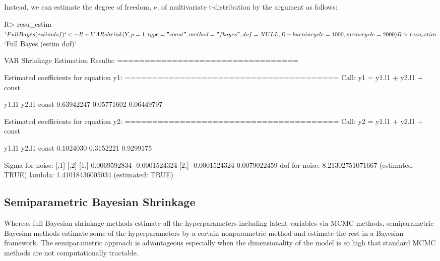 \documentclass[
]{jss}
\begin{document}
Instead, we can estimate the degree of freedom, \(\nu\), of multivariate
t-distribution by the argument  as follows:

\begin{CodeChunk}

\begin{CodeInput}
R> resu_estim$`Full Bayes (estim dof)` <-
R+   VARshrink(Y, p = 1, type = "const", method = "fbayes", dof = NULL,
R+             burnincycle = 1000, mcmccycle = 2000)
R> resu_estim$`Full Bayes (estim dof)`
\end{CodeInput}

\begin{CodeOutput}

VAR Shrinkage Estimation Results:
================================= 

Estimated coefficients for equation y1: 
======================================= 
Call:
y1 = y1.l1 + y2.l1 + const 

     y1.l1      y2.l1      const 
0.63942247 0.05771602 0.06449797 


Estimated coefficients for equation y2: 
======================================= 
Call:
y2 = y1.l1 + y2.l1 + const 

    y1.l1     y2.l1     const 
0.1024030 0.3152221 0.9299175 


Sigma for noise:
              [,1]          [,2]
[1,]  0.0069592834 -0.0001524324
[2,] -0.0001524324  0.0079022459
dof for noise: 8.21302751071667 (estimated: TRUE) 
lambda: 1.41018436005034 (estimated: TRUE) 
\end{CodeOutput}
\end{CodeChunk}

\hypertarget{semiparametric-bayesian-shrinkage}{%
\subsection{Semiparametric Bayesian
Shrinkage}\label{semiparametric-bayesian-shrinkage}}

\label{sec_sbayes}

Whereas full Bayesian shrinkage methods estimate all the hyperparameters
including latent variables via MCMC methods, semiparametric Bayesian
methods estimate some of the hyperparameters by a certain nonparametric
method and estimate the rest in a Bayesian framework. The semiparametric
approach is advantageous especially when the dimensionality of the model
is so high that standard MCMC methods are not computationally tractable.
\end{document}
